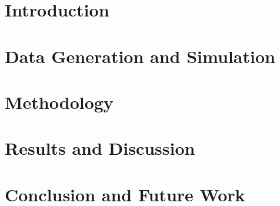 \documentclass[12pt,a4paper]{report}
\begin{document}
\tableofcontents
\listoffigures
\listoftables

\chapter{Introduction}


\chapter{Data Generation and Simulation}


\chapter{Methodology}


\chapter{Results and Discussion}


\chapter{Conclusion and Future Work}

\end{document}
